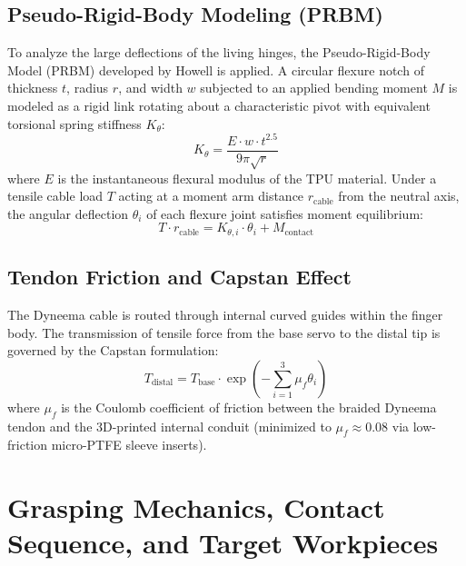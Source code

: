 \documentclass[12pt,a4paper]{report}
\begin{document}
\subsection{Pseudo-Rigid-Body Modeling (PRBM)}
To analyze the large deflections of the living hinges, the Pseudo-Rigid-Body Model (PRBM) developed by Howell \cite{howell2001compliant} is applied. A circular flexure notch of thickness $t$, radius $r$, and width $w$ subjected to an applied bending moment $M$ is modeled as a rigid link rotating about a characteristic pivot with equivalent torsional spring stiffness $K_\theta$:
\begin{equation}
    K_\theta = \frac{E \cdot w \cdot t^{2.5}}{9 \pi \sqrt{r}}
\end{equation}
where $E$ is the instantaneous flexural modulus of the TPU material. Under a tensile cable load $T$ acting at a moment arm distance $r_{\text{cable}}$ from the neutral axis, the angular deflection $\theta_i$ of each flexure joint satisfies moment equilibrium:
\begin{equation}
    T \cdot r_{\text{cable}} = K_{\theta, i} \cdot \theta_i + M_{\text{contact}}
\end{equation}

\subsection{Tendon Friction and Capstan Effect}
The Dyneema cable is routed through internal curved guides within the finger body. The transmission of tensile force from the base servo to the distal tip is governed by the Capstan formulation:
\begin{equation}
    T_{\text{distal}} = T_{\text{base}} \cdot \exp\left(-\sum_{i=1}^3 \mu_f \theta_i\right)
\end{equation}
where $\mu_f$ is the Coulomb coefficient of friction between the braided Dyneema tendon and the 3D-printed internal conduit (minimized to $\mu_f \approx 0.08$ via low-friction micro-PTFE sleeve inserts).


\section{Grasping Mechanics, Contact Sequence, and Target Workpieces}
\end{document}
